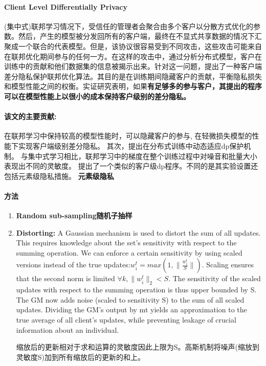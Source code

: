 \paragraph{Client Level Differentially Privacy }
(集中式)联邦学习情况下，受信任的管理者会聚合由多个客户以分散方式优化的参数。然后，产生的模型被分发回所有的客户端，最终在不显式共享数据的情况下汇聚成一个联合的代表模型。但是，该协议很容易受到不同攻击，这些攻击可能来自在联邦优化期间参与的任何一方。在这样的攻击中，通过分析分布式模型，客户在训练中的贡献和他们数据集的信息被揭示出来。针对这一问题，\cite{Geyer2017Client}提出了一种客户端差分隐私保护联邦优化算法。其目的是在训练期间隐藏客户的贡献，平衡隐私损失和模型性能之间的权衡。实证研究表明，如果\textbf{有足够多的参与客户，其提出的程序可以在模型性能上以很小的成本保持客户级别的差分隐私。}

\paragraph{该文的主要贡献:}在联邦学习中保持较高的模型性能时，可以隐藏客户的参与, 在轻微损失模型的性能下实现客户端级别差分隐私。
其次，提出在分布式训练中动态适应dp保护机制。 与集中式学习相比，联邦学习中的梯度在整个训练过程中对噪音和批量大小表现出不同的灵敏度。
\cite{McMahan2018Learning}提出了一个类似的客户级dp程序。不同的是其实验设置\cite{McMahan2018Learning}还包括元素级隐私措施。
\textbf{元素级隐私}

\paragraph{方法}
\begin{enumerate}
    \item \textbf{Random sub-sampling随机子抽样}
    \item \textbf{Distorting:} A Gaussian mechanism is used to distort the sum of all updates. This requires knowledge about the set’s sensitivity with respect to the summing operation. We can enforce a certain sensitivity by using scaled versions instead of the true updates:$w^t_i=max(1, \|  \frac{w^t_i}{S}\|)$. Scaling ensures that the second norm is limited $\forall k, \|w^t_i\|_2<S$. The sensitivity of the scaled updates with respect to the summing operation is thus upper bounded by S. The GM now adds noise (scaled to sensitivity S) to the sum of all scaled updates. Dividing the GM’s output by mt yields an approximation to the true average of all client’s updates, while preventing leakage of crucial information about an individual.

   缩放后的更新相对于求和运算的灵敏度因此上限为S。高斯机制将噪声(缩放到灵敏度S)加到所有缩放后的更新的和上。 
\end{enumerate}

